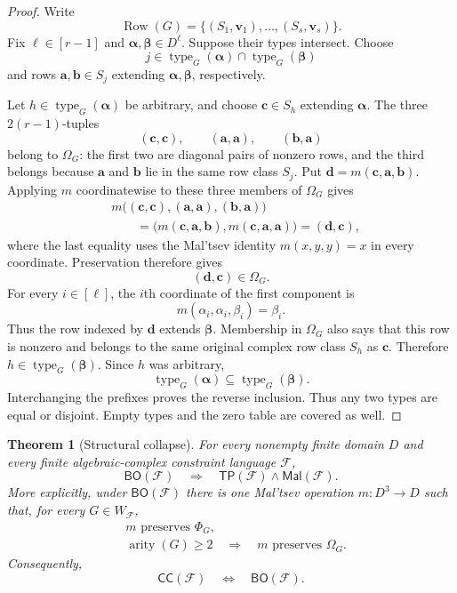 \documentclass[11pt]{article}
\theoremstyle{plain}
\newtheorem{theorem}{Theorem}[section]
\theoremstyle{definition}
\theoremstyle{remark}
\newcommand{\cF}{\mathcal F}
\newcommand{\CC}{\mathsf{CC}}
\newcommand{\BO}{\mathsf{BO}}
\newcommand{\TP}{\mathsf{TP}}
\newcommand{\Mal}{\mathsf{Mal}}
\newcommand{\SuppRel}[1]{\Phi_{#1}}
\newcommand{\RowEq}[1]{\Omega_{#1}}
\DeclareMathOperator{\arity}{arity}
\DeclareMathOperator{\typeop}{type}
\DeclareMathOperator{\Row}{Row}
\begin{document}
\begin{proof}
Write
\[
  \Row(G)=\{(S_1,\mathbf v_1),\ldots,(S_s,\mathbf v_s)\}.
\]
Fix $\ell\in[r-1]$ and
$\boldsymbol\alpha,\boldsymbol\beta\in D^\ell$.  Suppose their types
intersect.  Choose
\[
  j\in\typeop_G(\boldsymbol\alpha)
       \cap\typeop_G(\boldsymbol\beta)
\]
and rows $\mathbf a,\mathbf b\in S_j$ extending
$\boldsymbol\alpha,\boldsymbol\beta$, respectively.

Let $h\in\typeop_G(\boldsymbol\alpha)$ be arbitrary, and choose
$\mathbf c\in S_h$ extending $\boldsymbol\alpha$.  The three
$2(r-1)$-tuples
\[
  (\mathbf c,\mathbf c),\qquad
  (\mathbf a,\mathbf a),\qquad
  (\mathbf b,\mathbf a)
\]
belong to $\RowEq G$: the first two are diagonal pairs of nonzero rows, and
the third belongs because $\mathbf a$ and $\mathbf b$ lie in the same row
class $S_j$.  Put $\mathbf d=m(\mathbf c,\mathbf a,\mathbf b)$.  Applying
$m$ coordinatewise to these three members of $\RowEq G$ gives
\[
\begin{aligned}
  &m\bigl((\mathbf c,\mathbf c),
          (\mathbf a,\mathbf a),
          (\mathbf b,\mathbf a)\bigr)\\
  &\qquad=
  \bigl(m(\mathbf c,\mathbf a,\mathbf b),
        m(\mathbf c,\mathbf a,\mathbf a)\bigr)
  =(\mathbf d,\mathbf c),
\end{aligned}
\]
where the last equality uses the Mal'tsev identity $m(x,y,y)=x$ in every
coordinate.  Preservation therefore gives
\begin{equation*}
  (\mathbf d,\mathbf c)\in\RowEq G.
\end{equation*}
For every $i\in[\ell]$, the $i$th coordinate of the first component is
\[
  m(\alpha_i,\alpha_i,\beta_i)=\beta_i.
\]
Thus the row indexed by $\mathbf d$ extends $\boldsymbol\beta$.
Membership in $\RowEq G$ also says that this row is
nonzero and belongs to the same original complex row class $S_h$ as
$\mathbf c$.  Therefore $h\in\typeop_G(\boldsymbol\beta)$.  Since $h$ was
arbitrary,
\[
  \typeop_G(\boldsymbol\alpha)
  \subseteq\typeop_G(\boldsymbol\beta).
\]
Interchanging the prefixes proves the reverse inclusion.  Thus any two types
are equal or disjoint.  Empty types and the zero table are covered as well.
\end{proof}

\begin{theorem}[Structural collapse]
\label{thm:structural-collapse}
For every nonempty finite domain $D$ and every finite algebraic-complex
constraint language $\cF$,
\[
  \BO(\cF)\quad\Longrightarrow\quad\TP(\cF)\wedge\Mal(\cF).
\]
More explicitly, under $\BO(\cF)$ there is one Mal'tsev operation
$m:D^3\to D$ such that, for every $G\in W_{\cF}$,
\begin{equation*}
  \begin{aligned}
  &m\text{ preserves }\SuppRel G,\\
  &\arity(G)\ge2
    \quad\Longrightarrow\quad
    m\text{ preserves }\RowEq G.
  \end{aligned}
\end{equation*}
Consequently,
\[
  \CC(\cF)\quad\Longleftrightarrow\quad\BO(\cF).
\]
\end{theorem}
\end{document}
